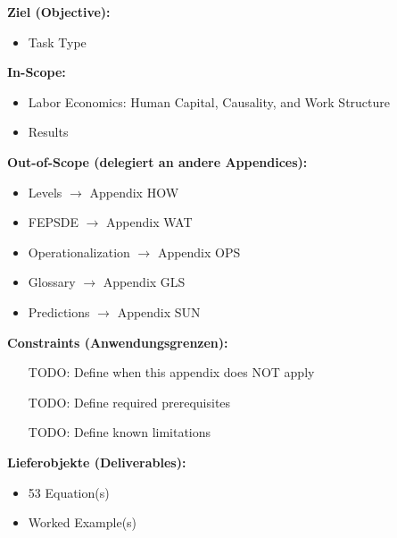 
\begin{tcolorbox}[
    colback=orange!5!white,
    colframe=orange!75!black,
    title={\textbf{Appendix Scope: Ziel / In-Scope / Out-of-Scope / Constraints}},
    fonttitle=\bfseries
]

\textbf{Ziel (Objective):}
\begin{itemize}[nosep]
    \item Task Type
\end{itemize}

\textbf{In-Scope:}
\begin{itemize}[nosep]
    \item Labor Economics: Human Capital, Causality, and Work Structure
    \item Results
\end{itemize}

\textbf{Out-of-Scope (delegiert an andere Appendices):}
\begin{itemize}[nosep]
    \item Levels $\rightarrow$ Appendix HOW
    \item FEPSDE $\rightarrow$ Appendix WAT
    \item Operationalization $\rightarrow$ Appendix OPS
    \item Glossary $\rightarrow$ Appendix GLS
    \item Predictions $\rightarrow$ Appendix SUN
\end{itemize}

\textbf{Constraints (Anwendungsgrenzen):}
\begin{itemize}[nosep]
    \item [TODO: Define when this appendix does NOT apply]
    \item [TODO: Define required prerequisites]
    \item [TODO: Define known limitations]
\end{itemize}

\textbf{Lieferobjekte (Deliverables):}
\begin{itemize}[nosep]
    \item 53 Equation(s)
    \item Worked Example(s)
\end{itemize}

\end{tcolorbox}


